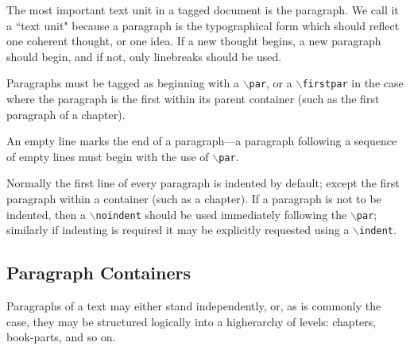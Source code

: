 \documentclass[11pt]{article}
\newcommand{\cmd}[1]{{\tt $\backslash$#1}}
\begin{document}



The most important text unit in a tagged document is the paragraph. We
call it a ``text unit" because a paragraph is the typographical form
which should reflect one coherent thought, or one idea. If a new
thought begins, a new paragraph should begin, and if not, only
linebreaks should be used.

Paragraphs must be tagged as beginning with a \cmd{par}, or a
\cmd{firstpar} in the case where the paragraph is the first within its
parent container (such as the first paragraph of a chapter).

An empty line marks the end of a paragraph---a paragraph following a
sequence of empty lines must begin with the use of \cmd{par}.

Normally the first line of every paragraph is indented by default;
except the first paragraph within a container (such as a chapter). If
a paragraph is not to be indented, then a \cmd{noindent} should be
used immediately following the \cmd{par}; similarly if indenting is
required it may be explicitly requested using a \cmd{indent}.


\subsection{Paragraph Containers}

Paragraphs of a text may either stand independently, or, as is
commonly the case, they may be structured logically into a higherarchy
of levels: chapters, book-parts, and so on.
\end{document}
